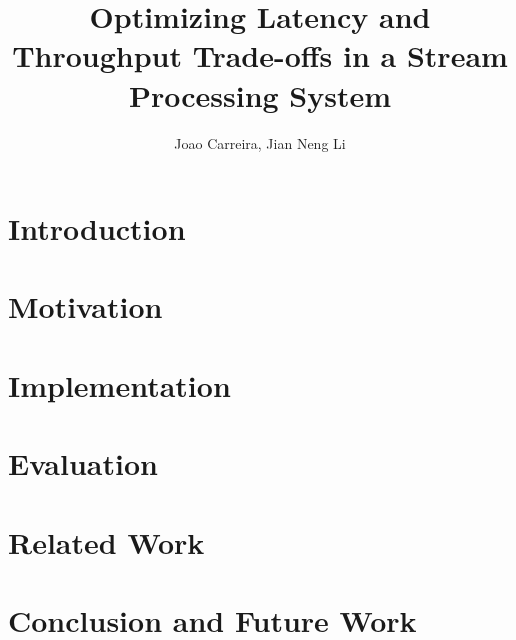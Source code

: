 \documentclass[10pt,twocolumn]{article}
\begin{document}
\title{{\bf Optimizing Latency and Throughput Trade-offs in a Stream Processing System}}
\author[1]{{Joao Carreira, Jian Neng Li}}
\date{}
\maketitle

\begin{abstract}
\noindent

\end{abstract}

\section{Introduction}


\section{Motivation}


\section{Implementation}


\section{Evaluation}


\section{Related Work}


\section{Conclusion and Future Work}




\end{document}
